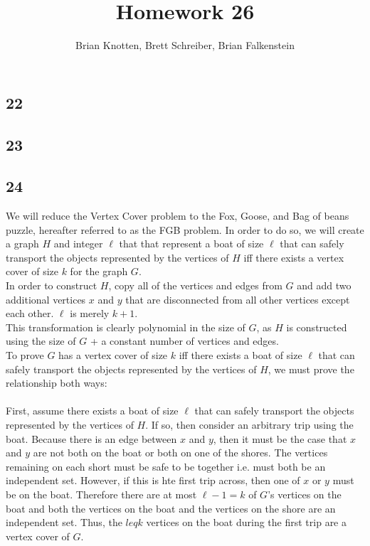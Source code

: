\documentclass[letterpaper,notitlepage,twoside]{article}
\begin{document}
\title{Homework 26}
\author{Brian Knotten, Brett Schreiber, Brian Falkenstein}
\maketitle
\subsection*{22}


\subsection*{23}


\subsection*{24}
We will reduce the Vertex Cover problem to the Fox, Goose, and Bag of beans puzzle, hereafter referred to as the FGB problem. In order to do so, we will create a graph $H$ and integer $\ell$ that that represent a boat of size $\ell$ that can safely transport the objects represented by the vertices of $H$ iff there exists a vertex cover of size $k$ for the graph $G$. \\
In order to construct $H$, copy all of the vertices and edges from $G$ and add two additional vertices $x$ and $y$ that are disconnected from all other vertices except each other. $\ell$ is merely $k+1$. \\
This transformation is clearly polynomial in the size of $G$, as $H$ is constructed using the size of $G$ + a constant number of vertices and edges. \\
To prove $G$ has a vertex cover of size $k$ iff there exists a boat of size $\ell$ that can safely transport the objects represented by the vertices of $H$, we must prove the relationship both ways: \\\\
First, assume there exists a boat of size $\ell$ that can safely transport the objects represented by the vertices of $H$. If so, then consider an arbitrary trip using the boat. Because there is an edge between $x$ and $y$, then it must be the case that $x$ and $y$ are not both on the boat or both on one of the shores. The vertices remaining on each short must be safe to be together i.e. must both be an independent set. However, if this is hte first trip across, then one of $x$ or $y$ must be on the boat. Therefore there are at most $\ell - 1 = k$ of $G$'s vertices on the boat and both the vertices on the boat and the vertices on the shore are an independent set. Thus, the $leq k$ vertices on the boat during the first trip are a vertex cover of $G$. \\\\ 
\end{document}
